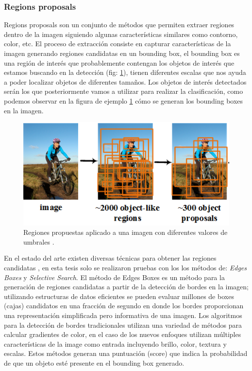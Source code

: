 \subsubsection{Regions proposals} \label{sub:regions-proposal}

Regions proposals son un conjunto de métodos que permiten extraer regiones dentro de la imagen siguiendo algunas características similares como contorno, color, etc. El proceso de extracción consiste en capturar características de la imagen generando regiones candidatas en un bounding box, el bounding box es una región de interés que probablemente contengan los objetos de interés que estamos buscando en la detección (fig: \ref{Fig: propsalregion}), tienen diferentes escalas que nos ayuda a poder localizar objetos de diferentes tamaños. Los objetos de interés detectados serán los que posteriormente vamos a utilizar para realizar la clasificación, como podemos observar en la figura de ejemplo \ref{Fig: propsalregion} cómo se generan los bounding boxes en la imagen.

\begin{figure}[H] \centering
  \includegraphics[scale=0.6,keepaspectratio=true,clip=true]{imagenes/MarcoTeorico/regionProposal.png}
  \caption{Regiones propuestas aplicado a una imagen con diferentes valores de umbrales \citep{regions_proposal_gr}.}
	\label{Fig: propsalregion}
\end{figure}

En el estado del arte existen diversas técnicas para obtener las regiones candidatas \citep{proposal}, en esta tesis  solo se realizaron pruebas con los  los métodos de: \textit{Edges Boxes} y \textit{Selective Search}. El método de Edges Boxes  \citep{edges} es un método para la generación de regiones candidatas a partir de la detección de bordes en la imagen; utilizando estructuras de datos eficientes se pueden evaluar millones de boxes (cajas) candidatos en una fracción de segundo en donde los bordes proporcionan una representación simplificada pero informativa de una imagen. Los algoritmos para la detección de bordes tradicionales utilizan una variedad de métodos para calcular gradientes de color, en el caso de los nuevos enfoques utilizan múltiples características de la image como entrada incluyendo brillo, color, textura y escalas. Estos métodos generan una puntuación (score) que indica la probabilidad de que un objeto esté presente en el bounding box generado.

